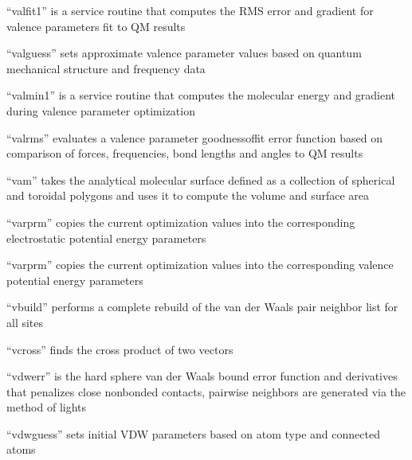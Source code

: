 \documentclass[letterpaper,11pt,english]{sphinxmanual}
\begin{document}

“valfit1” is a service routine that computes the RMS error
and gradient for valence parameters fit to QM results


“valguess” sets approximate valence parameter values based on
quantum mechanical structure and frequency data


“valmin1” is a service routine that computes the molecular
energy and gradient during valence parameter optimization


“valrms” evaluates a valence parameter goodness\sphinxhyphen{}of\sphinxhyphen{}fit error
function based on comparison of forces, frequencies, bond
lengths and angles to QM results


“vam” takes the analytical molecular surface defined
as a collection of spherical and toroidal polygons
and uses it to compute the volume and surface area


“varprm” copies the current optimization values into the
corresponding electrostatic potential energy parameters


“varprm” copies the current optimization values into the
corresponding valence potential energy parameters


“vbuild” performs a complete rebuild of the van der Waals
pair neighbor list for all sites


“vcross” finds the cross product of two vectors


“vdwerr” is the hard sphere van der Waals bound error function
and derivatives that penalizes close nonbonded contacts,
pairwise neighbors are generated via the method of lights


“vdwguess” sets initial VDW parameters based on atom type
and connected atoms
\end{document}

